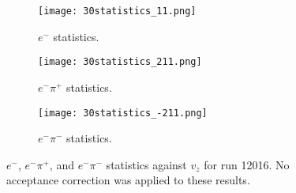     \begin{figure}
        \centering
        \begin{subfigure}[b]{\textwidth}
            \centering
            \texttt{[image: 30statistics\_11.png]}
            \caption{$e^-$ statistics.}
            \label{fig::14.30::statistics_11}
        \end{subfigure}
        \centering
        \begin{subfigure}[b]{0.49\textwidth}
            \centering
            \texttt{[image: 30statistics\_211.png]}
            \caption{$e^-\pi^+$ statistics.}
            \label{fig::14.30::statistics_211}
        \end{subfigure}
        \hfill
        \begin{subfigure}[b]{0.49\textwidth}
            \centering
            \texttt{[image: 30statistics\_-211.png]}
            \caption{$e^-\pi^-$ statistics.}
            \label{fig::14.30::statistics_-211}
        \end{subfigure}
        \caption[Statistics for $e^-$, $e^-\pi^+$, and $e^-\pi^-$ against $v_z$]
        {$e^-$, $e^-\pi^+$, and $e^-\pi^-$ statistics against $v_z$ for run 12016.
        No acceptance correction was applied to these results.}
        \label{fig::14.30::statistics}
    \end{figure}
